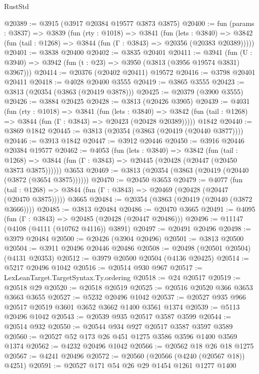 \begin{lexlean}{RustStd}
\begin{coremodule}
{\begin{coremodule}
{{{{{{{{{{{{{{{{{{{{{{{{{{{{{{{{{{{@20389 := @3915 (@3917 @20384 @19577 @3873 @3875)
@20400 := fun (params : @3837) =>
  @3839
    (fun (rty : @1018) =>
    @3841
      (fun (lets : @3840) =>
      @3842 (fun (tail : @1268) => @3844 (fun (Γ : @3843) => @20356 (@20383 @20389)))))
@20401 := @3838 @20400
@20402 := @3835 @20401
@20411 := @3941
    (fun (U : @3940) => @3942 (fun (t : @23) => @3950 (@3813 (@3956 @19574 @3831) @3967)))
@20414 := @20376 (@20402 @20411) @19572
@20416 := @3798 @20401 @20411
@20418 := @4028 @20400 @3555
@20419 := @3865 @3555
@20423 := @3813 (@20354 (@3863 (@20419 @3878)))
@20425 := @20379 (@3900 @3555)
@20426 := @3884 @20425
@20428 := @3813 (@20426 @3905)
@20439 := @4031
    (fun (rty : @1018) =>
    @3841
      (fun (lets : @3840) =>
      @3842 (fun (tail : @1268) => @3844 (fun (Γ : @3843) => @20423 (@20428 @20389)))))
    @1842
@20440 := @3869 @1842
@20445 := @3813 (@20354 (@3863 (@20419 (@20440 @3877))))
@20446 := @3913 @1842
@20447 := @3912 @20446
@20450 := @3916 @20446 @20384 @19577
@20462 := @4053
    (fun (lets : @3840) =>
    @3842
      (fun (tail : @1268) =>
      @3844 (fun (Γ : @3843) => @20445 (@20428 (@20447 (@20450 @3873 @3875))))))
    @3653
@20469 := @3813 (@20354 (@3863 (@20419 (@20440 (@3872 (@3654 @3875))))))
@20470 := @20450 @3653
@20479 := @4077
    (fun (tail : @1268) => @3844 (fun (Γ : @3843) => @20469 (@20428 (@20447 (@20470 @3875)))))
    @3665
@20484 := @20354 (@3863 (@20419 (@20440 (@3872 @3666))))
@20485 := @3813 @20484
@20486 := @20470 @3665
@20491 := @4095 (fun (Γ : @3843) => @20485 (@20428 (@20447 @20486)))
@20496 := @11147 (@4108 (@4111 (@10762 @4116)) @3891)
@20497 := @20491 @20496
@20498 := @3979 @20484
@20500 := @20426 (@3904 @20496)
@20501 := @3813 @20500
@20504 := @3911 @20496 @20446 @20486
@20508 := @20498 (@20501 @20504) (@4131 @20353)
@20512 := @3979 @20500 @20504 (@4136 @20425)
@20514 := @5217 @20496 @1042
@20516 := @20514 @930 @967
@20517 := LexLeanTarget.TargetSyntax.Ty.ordering
@20518 := @24 @20517
@20519 := @20518 @29
@20520 := @20518 @20519
@20525 := @20516 @20520 @366 @3653 @3663 @3655
@20527 := @5232 @20496 @1042
@20537 := @20527 @935 @966 @20517 @20519 @3601 @3652 @3662 @1400 @3561 @1374
@20539 := @5113 @20496 @1042
@20543 := @20539 @935 @20517 @3587 @3599
@20544 := @20514 @932
@20550 := @20544 @934 @927 @20517 @3587 @3597 @3589
@20560 := @20527 @52 @173 @26 @451 @1275 @3586 @3596 @1400 @3569 @1374
@20562 := @4232 @20496 @1042
@20566 := @20562 @18 @26 @18 @1275
@20567 := @4241 @20496
@20572 := @20560 (@20566 (@4240 (@20567 @18)) @4251)
@20591 := @20527
    @171
    @54
    @26
    @29
    @1454
    @1261
    @1277
    @1400
}}}}}}}}}}}}}}}}}}}}}}}}}}}}}}}}}}}
\end{coremodule}}
\end{coremodule}
\end{lexlean}
